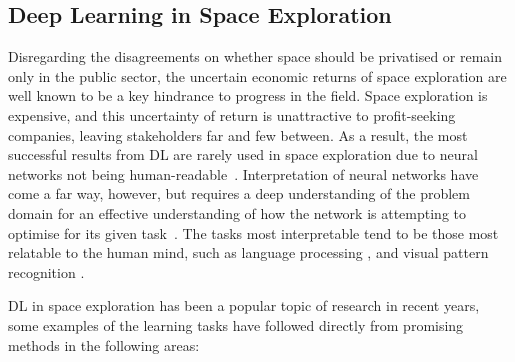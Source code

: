 \subsection{Deep Learning in Space Exploration}

Disregarding the disagreements on whether space should be privatised or remain only in the public sector, the uncertain economic returns of space exploration are well known to be a key hindrance to progress in the field. Space exploration is expensive, and this uncertainty of return is unattractive to profit-seeking companies, leaving stakeholders far and few between. As a result, the most successful results from \gls{DL} are rarely used in space exploration due to neural networks not being human-readable~\cite {esa_ai}. Interpretation of neural networks have come a far way, however, but requires a deep understanding of the problem domain for an effective understanding of how the network is attempting to optimise for its given task~\cite{Montavon2018, Sheu2020, goh2021multimodal, molnar_2022}. The tasks most interpretable tend to be those most relatable to the human mind, such as language processing \cite{belinkov-etal-2020-interpretability, DBLP:journals/corr/abs-2108-04840}, and visual pattern recognition \cite{DBLP:journals/corr/abs-1802-00121}.

\gls{DL} in space exploration has been a popular topic of research in recent
years, some examples of the learning tasks have followed directly from
promising methods in the following areas:

